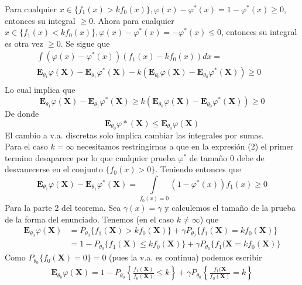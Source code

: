 \documentclass[peerreview]{IEEEtran}
\begin{document}
Para cualquier $x \in \{ f_1(x) > kf_0(x)\}, \varphi(x) -\varphi^*(x)= 1- \varphi^*(x) \geq 0 $, entonces su integral $\geq 0$. 
Ahora para cualquier $x \in \{ f_1(x) < kf_0(x)\}, \varphi(x) -\varphi^*(x)= - \varphi^*(x) \leq 0 $, entonces su integral es otra vez $\geq 0$. Se sigue que  
\begin{equation*}
\begin{split}
\int ( \varphi(x) -\varphi^*(x) ) (f_1(x)-kf_0(x))dx = &  \\  
\mathbf{E}_{\theta_1}\varphi(\mathbf{X} ) - \mathbf{E}_{\theta_1}\varphi^*(\mathbf{X} ) -k(\mathbf{E}_{\theta_0}\varphi(\mathbf{X} ) - \mathbf{E}_{\theta_0}\varphi^*(\mathbf{X} ) )\geq 0 & \\
\end{split}
\end{equation*}
Lo cual implica que 
\[\mathbf{E}_{\theta_1}\varphi(\mathbf{X} ) - \mathbf{E}_{\theta_1}\varphi^*(\mathbf{X} ) \geq k(\mathbf{E}_{\theta_0}\varphi(\mathbf{X} ) - \mathbf{E}_{\theta_0}\varphi^*(\mathbf{X} ) ) \geq 0
\] 
De donde 
\[
\mathbf{E}_{\theta_0}\varphi*(\mathbf{X} ) \leq \mathbf{E}_{\theta_0}\varphi(\mathbf{X} )
\]
El cambio a v.a. discretas solo implica cambiar las integrales por sumas.\\
Para el caso $k = \infty $ necesitamos restringirnos a que en la expresión (2) el primer termino desaparece por lo que cualquier prueba $\varphi^*$ de tamaño $0$ debe de desvanecerse en el conjunto $\{ f_0(x) > 0\}$. Teniendo entonces que 
\[
\mathbf{E}_{\theta_1}\varphi(\mathbf{X} ) - \mathbf{E}_{\theta_1}\varphi^*(\mathbf{X} ) =\int\limits_{f_0(x)=0} (1 -\varphi^*(x))f_1(x) \geq 0
\]
Para la parte 2 del teorema. Sea $\gamma(x)=\gamma$ y calculemos el tamaño de la prueba de la forma del enunciado.
Tenemos (en el caso $k\ne \infty$) que 
\begin{equation*}
\begin{split}
\mathbf{E}_{\theta_0}\varphi(\mathbf{X} )& = P_{\theta_0}\{f_1(\mathbf{X}) > kf_0(\mathbf{X}) \} +\gamma P_{\theta_0}\{ f_1 ( \mathbf{X}) = kf_0(\mathbf{X})\}\\
&= 1-P_{\theta_0}\{ f_1(\mathbf{X}) \leq kf_0(\mathbf{X})\}+ \gamma P_{\theta_0}\{ f_1(\mathbf{X} = k f_0(\mathbf{X}) \}
\end{split}
\end{equation*}
Como $P_{\theta_0}\{ f_0(\mathbf{X} )= 0 \}= 0$ (pues la v.a. es continua) podemos escribir 
\begin{equation*}
\begin{split}
\mathbf{E}_{\theta_0}\varphi(\mathbf{X} )= 1-P_{\theta_0}\left\{ \frac{f_1(\mathbf{X})}{f_0(\mathbf{X})} \leq k \right\} + \gamma P_{\theta_0}\left\{ \frac{f_1(\mathbf{X}}{f_0(\mathbf{X})} = k  \right\}
\end{split}
\end{equation*}
\end{document}
